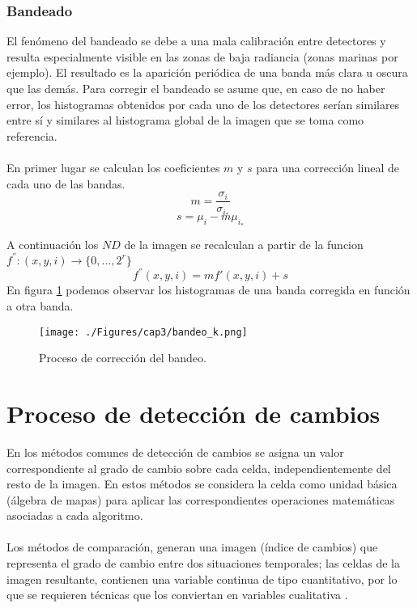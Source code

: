 \subsubsection{Bandeado}\label{subsec:bandeado}
El fen\'omeno del bandeado se debe a una mala calibraci\'on entre detectores y resulta especialmente visible en las zonas de baja radiancia (zonas marinas por ejemplo). El resultado es la aparici\'on peri\'odica de una banda m\'as clara u oscura que las dem\'as.
Para corregir el bandeado se asume que, en caso de no haber error, los histogramas obtenidos por cada uno de los detectores ser\'ian similares entre s\'i y similares al histograma global de la imagen que se toma como referencia.\\~\\
En primer lugar se calculan los coeficientes $ m $ y $ s $ para una correcci\'on lineal de cada uno de las bandas.
		\begin{equation}
		m =\dfrac{\sigma_{i}}{\sigma_{i_{*}}}
		\end{equation} 	
				\begin{equation}
				s=\mu_{i} - m\mu_{i_{*}}
				\end{equation} 	
				

A continuaci\'on los $ ND $ de la imagen se recalculan a partir de la funcion $ f^{''}:(x,y,i) \longrightarrow \{0,...,2^{r}\} $
				\begin{equation}
				f^{''}(x,y,i) = m f'(x,y,i) + s
				\end{equation} 				
En figura \ref{fig:bandeado} podemos observar los histogramas de una banda corregida en funci\'on a otra banda.
    \begin{figure}[H]
    	\centering
    	\texttt{[image: ./Figures/cap3/bandeo\_k.png]}
    	\caption{Proceso de correcci\'on del bandeo.}
    	\label{fig:bandeado}
    \end{figure}

\section{Proceso de detecci\'on de cambios}
	En los m\'etodos comunes de detecci\'on de cambios se asigna un valor correspondiente al grado de cambio sobre cada celda, independientemente del resto de la imagen. En estos m\'etodos se considera la celda como unidad b\'asica (\'algebra de mapas) para aplicar las correspondientes operaciones matem\'aticas asociadas a cada algoritmo.\\~\\
Los m\'etodos de comparaci\'on, generan una imagen (\'indice de cambios) que representa el grado de cambio entre dos situaciones temporales; las celdas de la imagen resultante, contienen una variable continua de tipo cuantitativo, por lo que se requieren t\'ecnicas que los conviertan en variables cualitativa \cite{martinez2013normalizacion}.
